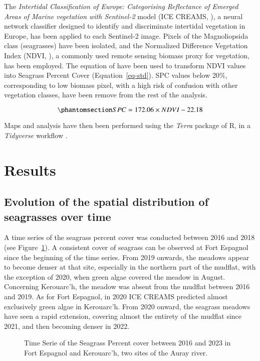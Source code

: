 \documentclass[
  number]{elsarticle}
\begin{document}
The \emph{Intertidal Classification of Europe: Categorising Reflectance
of Emerged Areas of Marine vegetation with Sentinel-2} model (ICE
CREAMS, \citep{Davies2024}), a neural network classifier designed to
identify and discriminate intertidal vegetation in Europe, has been
applied to each Sentinel-2 image. Pixels of the Magnoliopsida class
(seagrasses) have been isolated, and the Normalized Difference
Vegetation Index (NDVI, \citep{rouse1974monitoring}), a commonly used
remote sensing biomass proxy for vegetation, has been employed. The
equation of \citep{zoffoli2020sentinel} have been used to transform NDVI
values into Seagrass Percent Cover (Equation~\ref{eq-std}). SPC values
below 20\%, corresponding to low biomass pixel, with a high risk of
confusion with other vegetation classes, have been remove from the rest
of the analysis.

\begin{equation}\phantomsection\label{eq-std}{
SPC = 172.06 \times NDVI - 22.18
}\end{equation}

Maps and analysis have then been performed using the \emph{Terra}
package of R, in a \emph{Tidyverse} workflow
\citep{hijmans2023terra, wickham2017easily}.

\section{Results}\label{results}

\subsection{Evolution of the spatial distribution of seagrasses over
time}\label{evolution-of-the-spatial-distribution-of-seagrasses-over-time}

A time series of the seagrass percent cover was conducted between 2016
and 2018 (see Figure~\ref{fig-Maps}). A consistent cover of seagrass can
be observed at Fort Espagnol since the beginning of the time series.
From 2019 onwards, the meadows appear to become denser at that site,
especially in the northern part of the mudflat, with the exception of
2020, when green algae covered the meadow in August. Concerning
Kerouarc'h, the meadow was absent from the mudflat between 2016 and
2019. As for Fort Espagnol, in 2020 ICE CREAMS predicted almost
exclusively green algae in Kerouarc'h. From 2020 onward, the seagrass
meadows have seen a rapid extension, covering almost the entirety of the
mudflat since 2021, and then becoming denser in 2022.

\label{cell-fig-Maps}
\begin{figure}[H]


\caption{\label{fig-Maps}Time Serie of the Seagrass Percent cover
between 2016 and 2023 in Fort Espagnol and Kerouarc'h, two sites of the
Auray river.}

\end{figure}%


  
\end{document}
